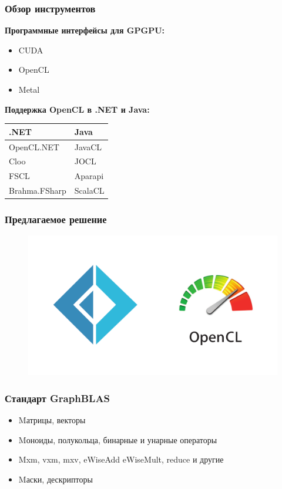 \documentclass{beamer}
\begin{document}
\begin{frame}  
  \frametitle{Обзор инструментов}
  \textbf{Программные интерфейсы для GPGPU:}
  \begin{itemize}
    \item CUDA
  	\item OpenCL
    \item Metal
  \end{itemize}
  \bigskip
  \textbf{Поддержка OpenCL в .NET и Java:}
  \begin{table}[htbp]
  \begin{tabularx}{\textwidth}{X|X}
    .NET & Java \\
    \hline
    OpenCL.NET & JavaCL \\
    Cloo & JOCL \\
    FSCL & Aparapi \\
    Brahma.FSharp & ScalaCL \\
    \hline
  \end{tabularx}
  \end{table}
\end{frame}

\begin{frame}  
  \frametitle{Предлагаемое решение}
  \begin{figure}
    \includegraphics[scale=0.2]{pictures/impl1.png}
  \end{figure}
\end{frame}
       
\begin{frame}[fragile]
  \frametitle{Стандарт GraphBLAS}
    \begin{itemize}
      \item Mатрицы, векторы
      \item Mоноиды, полукольца, бинарные и унарные операторы
      \item Mxm, vxm, mxv, eWiseAdd eWiseMult, reduce и другие
      \item Mаски, дескрипторы
    \end{itemize}
\end{frame}
\end{document}
